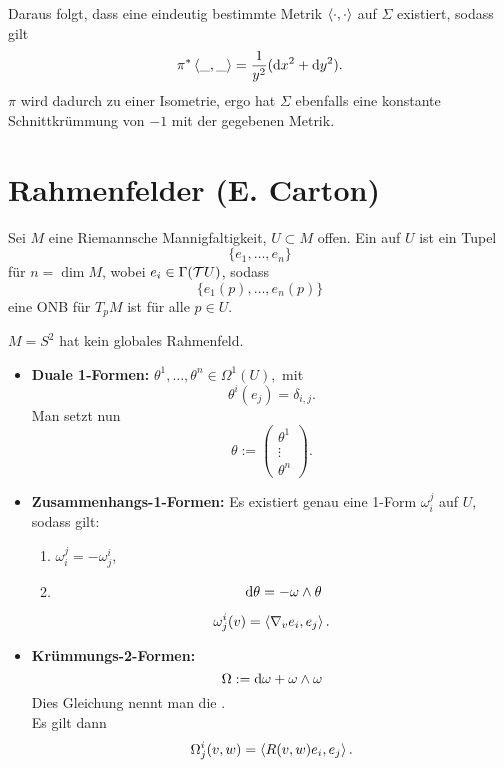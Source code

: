 Daraus folgt, dass eine eindeutig bestimmte Metrik $\left<\cdot, \cdot\right>$ auf $\Sigma$ existiert, sodass gilt
\[ \pi^*\left<\_,\_\right> = \frac{1}{y^2} (\text{d} x^2 + \text{d} y^2). \]
$\pi$ wird dadurch zu einer Isometrie, ergo hat $\Sigma$ ebenfalls eine konstante Schnittkrümmung von $-1$ mit der gegebenen Metrik.


\section{Rahmenfelder (E. Carton)}
Sei $M$ eine Riemannsche Mannigfaltigkeit, $U \subset M$ offen.
\Def{}
Ein  auf $U$ ist ein Tupel
\[ \{e_1, \ldots, e_n\} \]
für $n = \dim M$, wobei $e_i\in \Gamma(\mathcal{T} U)$, sodass
\[ \{e_1(p), \ldots, e_n(p)\} \]
eine ONB für $T_pM$ ist für alle $p \in U$.

\Bsp{}
$M = S^2$ hat kein globales Rahmenfeld.
\begin{itemize}
	\item \textbf{Duale 1-Formen:} $\theta^1, \ldots, \theta^n \in \Omega^1(U),$ mit
	\[ \theta^i(e_j) = \delta_{i,j}. \]
	Man setzt nun
	\[ \theta := 
	\left(
	\begin{matrix}
	\theta^1\\
	\vdots\\
	\theta^n
	\end{matrix}
	\right).
	 \]
	 \item \textbf{Zusammenhangs-1-Formen:} Es existiert genau eine 1-Form $\omega^j_i$ auf $U$, sodass gilt:
	 \begin{enumerate}[(1)]
	 	\item $\omega^j_i = -\omega^i_j$,
	 	\item {}
	 	\[\text{d} \theta = - \omega \wedge \theta\] 
	 \end{enumerate}
 	\[ \omega^i_j (v) = \left<\nabla_v e_i, e_j\right>. \]
 	 \item \textbf{Krümmungs-2-Formen:}
 	 \[ \Omega := \text{d} \omega + \omega \wedge \omega \]
 	 Dies Gleichung nennt man die .\\
 	 Es gilt dann
 	 \[ \Omega^i_j(v,w) = \left< R(v,w)e_i, e_j\right>. \]
\end{itemize}

